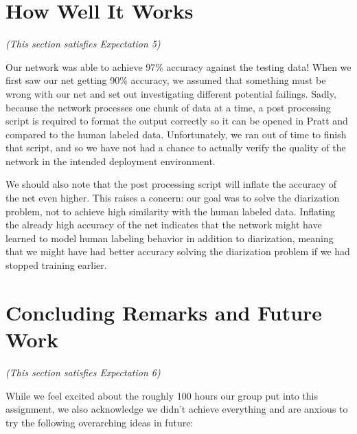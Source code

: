 \documentclass[11pt]{article}
\begin{document}


\newpage\section{How Well It Works}
\textit{(This section satisfies Expectation 5)}

Our network was able to achieve 97\% accuracy against the testing data! When we first saw our net getting 90\% accuracy, we assumed that something must be wrong with our net and set out investigating different potential failings. Sadly, because the network processes one chunk of data at a time, a post processing script is required to format the output correctly so it can be opened in Pratt and compared to the human labeled data. Unfortunately, we ran out of time to finish that script, and so we have not had a chance to actually verify the quality of the network in the intended deployment environment.

We should also note that the post processing script will inflate the accuracy of the net even higher. This raises a concern: our goal was to solve the diarization problem, not to achieve high similarity with the human labeled data. Inflating the already high accuracy of the net indicates that the network might have learned to model human labeling behavior in addition to diarization, meaning that we might have had better accuracy solving the diarization problem if we had stopped training earlier.



\newpage\section{Concluding Remarks and Future Work}
\textit{(This section satisfies Expectation 6)}

While we feel excited about the roughly 100 hours our group put into this assignment, we also acknowledge we didn't achieve everything and are anxious to try the following overarching ideas in future:
\end{document}
